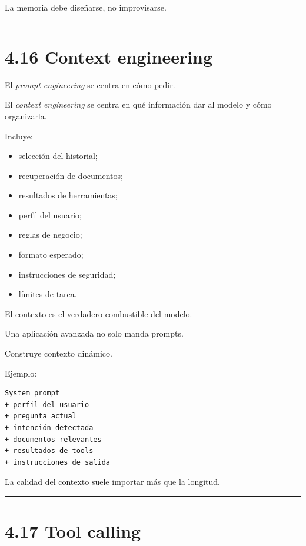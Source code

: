 La memoria debe diseñarse, no improvisarse.

\begin{center}\rule{0.5\linewidth}{0.5pt}\end{center}

\section{4.16 Context engineering}\label{context-engineering}

El \emph{prompt engineering} se centra en cómo pedir.

El \emph{context engineering} se centra en qué información dar al modelo
y cómo organizarla.

Incluye:

\begin{itemize}
\tightlist
\item
  selección del historial;
\item
  recuperación de documentos;
\item
  resultados de herramientas;
\item
  perfil del usuario;
\item
  reglas de negocio;
\item
  formato esperado;
\item
  instrucciones de seguridad;
\item
  límites de tarea.
\end{itemize}

El contexto es el verdadero combustible del modelo.

Una aplicación avanzada no solo manda prompts.

Construye contexto dinámico.

Ejemplo:

\begin{lstlisting}
System prompt
+ perfil del usuario
+ pregunta actual
+ intención detectada
+ documentos relevantes
+ resultados de tools
+ instrucciones de salida
\end{lstlisting}

La calidad del contexto suele importar más que la longitud.

\begin{center}\rule{0.5\linewidth}{0.5pt}\end{center}

\section{4.17 Tool calling}\label{tool-calling-1}

